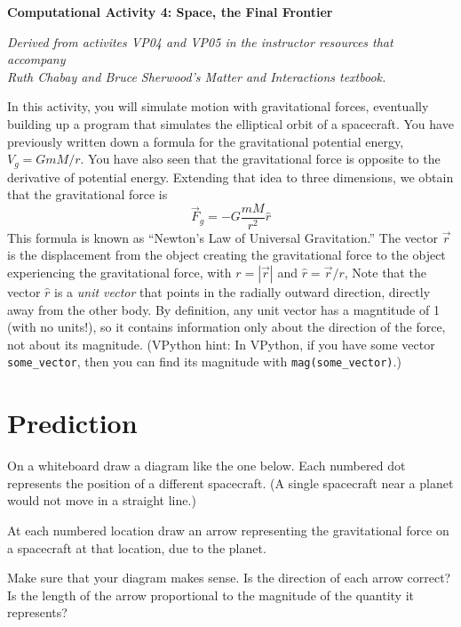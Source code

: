 \documentclass[11pt]{article}
\begin{document}
\begin{center}
\medskip
{\bf{Computational Activity 4: Space, the Final Frontier}} 
\medskip

{\em{Derived from activites VP04 and VP05 in the instructor resources that
 accompany \\ Ruth Chabay and Bruce Sherwood's {\em Matter and Interactions} 
 textbook.}}
\medskip
\end{center}

In this activity, you will simulate motion with gravitational forces,
eventually building up a program that simulates the elliptical orbit of
a spacecraft.
You have previously written down a formula for the gravitational 
potential energy, $V_g = G m M / r$.  You have also seen that the 
gravitational force is opposite to the derivative of potential energy.
Extending that idea to three dimensions, we obtain that the gravitational
force is
\begin{displaymath}
{\vec F}_g = - G \frac{m M}{r^2} {\hat r}
\end{displaymath}
This formula is known as ``Newton's Law of Universal Gravitation.''  
The vector $\vec r$ is the displacement from the object creating the 
gravitational force to the object experiencing the gravitational force,
with $r = | \vec r | $ and $\hat r = \vec r / r$, 
Note that the vector $\hat r$ is a {\em unit vector} that points in the
radially outward direction, directly away from the other body.  
By definition, any unit vector has a magntitude of 1 (with no units!), so it
contains information only about the direction of the force, not about
its magnitude. (VPython hint: In VPython, if you have some vector \texttt{some\_vector}, then you can find its magnitude with \texttt{mag(some\_vector)}.)

\section{Prediction}

\begin{compactitem}[\color{MIRed}$\Rightarrow$]
\item On a whiteboard draw a diagram like the one below.  Each numbered dot represents the position of a different spacecraft. (A single spacecraft near a planet would not move in a straight line.)
\item At each numbered location draw an arrow representing the gravitational force on a spacecraft at that location, due to the planet.
\item Make sure that your diagram makes sense.  Is the direction of each arrow correct? Is the length of the arrow proportional to the magnitude of the quantity it represents?\\
\end{compactitem}
\end{document}
